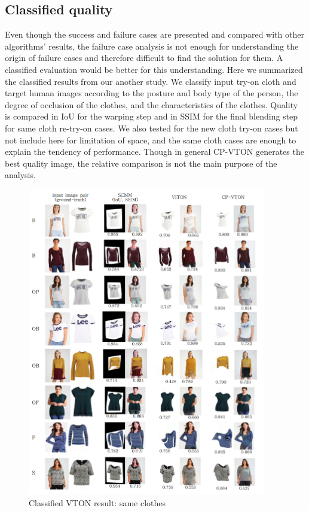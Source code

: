 \documentclass[runningheads]{llncs}
\begin{document}
\subsection{Classified quality}

Even though the success and failure cases are presented and compared with other algorithms' results, the failure case analysis is not enough for understanding the origin of failure cases and therefore difficult to find the solution for them. A classified evaluation would be better for this understanding. Here we summarized the classified results from our another study. We classify input try-on cloth and target human images according to the posture and body type of the person, the degree of occlusion of the clothes, and the characteristics of the clothes. Quality is compared in IoU for the warping step and in SSIM for the final blending step for same cloth re-try-on cases. We also tested for the new cloth try-on cases but not include here for limitation of space, and the same cloth cases are enough to explain the tendency of performance. Though in general CP-VTON generates the best quality image, the relative comparison is not the main purpose of the analysis. 


\begin{figure}
\centering
\includegraphics[height=13.5cm]{figures/2dvton_same.png}   %
\caption{Classified VTON result: same clothes}
\label{fig:classified2DVTONresult}
\end{figure}
\end{document}
